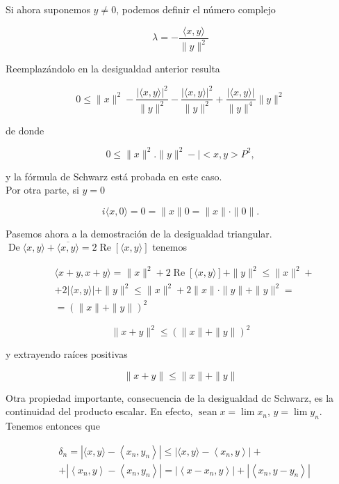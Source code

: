 \documentclass[10pt]{article}
\theoremstyle{plain}
\theoremstyle{definition}
\theoremstyle{remark}
\begin{document}
Si ahora suponemos $y \neq 0$, podemos definir el número complejo

$$
\lambda=-\frac{\langle x, y\rangle}{\|y\|^{2}}
$$

Reemplazándolo en la desigualdad anterior resulta

$$
0 \leqslant\|x\|^{2}-\frac{|\langle x, y\rangle|^{2}}{\|y\|^{2}}-\frac{|\langle x, y\rangle|^{2}}{\|y\|^{2}}+\frac{|\langle x, y\rangle|}{\|y\|^{4}}\|y\|^{2}
$$

de donde

$$
0 \leqslant\|x\|^{2} .\|y\|^{2}-\mid<x, y>P^{2},
$$

y la fórmula de Schwarz está probada en este caso.\\
Por otra parte, si $y=0$

$$
i\langle x, 0\rangle=0=\|x\| 0=\|x\| \cdot\|0\| .
$$

Pasemos ahora a la demostración de la desigualdad triangular.\\
$\operatorname{De}\langle x, y\rangle+\overline{\langle x, y\rangle}=2 \operatorname{Re}[\langle x, y\rangle]$ tenemos

$$
\begin{aligned}
& \langle x+y, x+y\rangle=\|x\|^{2}+2 \operatorname{Re}[\langle x, y\rangle]+\|y\|^{2} \leqslant\|x\|^{2}+ \\
& +2|\langle x, y\rangle|+\|y\|^{2} \leqslant\|x\|^{2}+2\|x\| \cdot\|y\|+\|y\|^{2}= \\
& =(\|x\|+\|y\|)^{2}
\end{aligned}
$$

$$
\|x+y\|^{2} \leqslant(\|x\|+\|y\|)^{2}
$$

y extrayendo raíces positivas

$$
\|x+y\| \leqslant\|x\|+\|y\|
$$

Otra propiedad importante, consecuencia de la desigualdad dc Schwarz, es la continuidad del producto escalar. En efecto, $\operatorname{sean} x=\lim x_{n}$, $y=\lim y_{n}$. Tenemos entonces que

$$
\begin{aligned}
& \delta_{n}=\left|\langle x, y\rangle-\left\langle x_{n}, y_{n}\right\rangle\right| \leqslant\left|\langle x, y\rangle-\left\langle x_{n}, y\right\rangle\right|+ \\
& +\left|\left\langle x_{n}, y\right\rangle-\left\langle x_{n}, y_{n}\right\rangle\right|=\left|\left\langle x-x_{n}, y\right\rangle\right|+\left|\left\langle x_{n}, y-y_{n}\right\rangle\right|
\end{aligned}
$$
\end{document}
